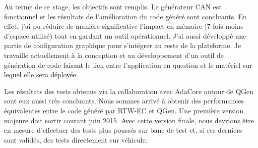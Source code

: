 Au terme de ce stage, les objectifs sont remplis. Le générateur CAN est
fonctionnel et les résultats de l'amélioration du code généré sont concluants.
En effet, j'ai pu réduire de manière significative l'impact en mémoire (7 fois
moins d'espace utilisé) tout en gardant un outil opérationnel. J'ai aussi
développé une partie de configuration graphique pour s'intégrer au reste de la
plateforme. Je travaille actuellement à la conception et au développement d'un
outil de génération de code faisant le lien entre l'application en question et
le matériel sur lequel elle sera déployée.

Les résultats des tests obtenus via la collaboration avec AdaCore autour de QGen
sont eux aussi très concluants. Nous sommes arrivé à obtenir des performances
équivalentes entre le code généré par RTW-EC\up{\circledR} et QGen. Une première
version majeure doit sortir courant juin 2015. Avec cette version finale, nous
devrions être en mesure d'effectuer des tests plus poussés sur banc de test et,
si ces derniers sont validés, des tests directement sur véhicule.



